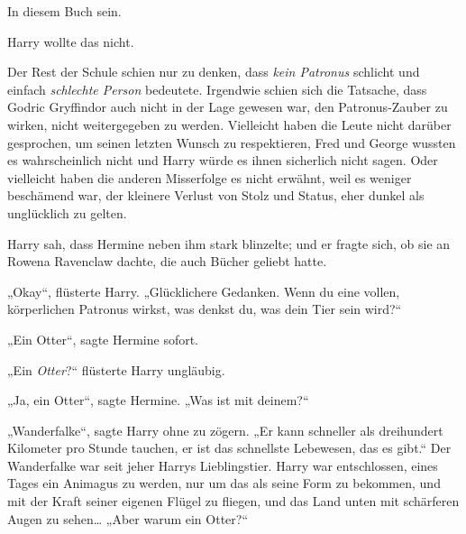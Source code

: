 In diesem Buch sein.

Harry wollte das nicht.

Der Rest der Schule schien nur zu denken, dass \emph{kein Patronus} schlicht und einfach \emph{schlechte Person} bedeutete. Irgendwie schien sich die Tatsache, dass Godric Gryffindor auch nicht in der Lage gewesen war, den Patronus-Zauber zu wirken, nicht weitergegeben zu werden. Vielleicht haben die Leute nicht darüber gesprochen, um seinen letzten Wunsch zu respektieren, Fred und George wussten es wahrscheinlich nicht und Harry würde es ihnen sicherlich nicht sagen. Oder vielleicht haben die anderen Misserfolge es nicht erwähnt, weil es weniger beschämend war, der kleinere Verlust von Stolz und Status, eher dunkel als unglücklich zu gelten.

Harry sah, dass Hermine neben ihm stark blinzelte; und er fragte sich, ob sie an Rowena Ravenclaw dachte, die auch Bücher geliebt hatte.

„Okay“, flüsterte Harry. „Glücklichere Gedanken. Wenn du eine vollen, körperlichen Patronus wirkst, was denkst du, was dein Tier sein wird?“

„Ein Otter“, sagte Hermine sofort.

„Ein \emph{Otter}?“ flüsterte Harry ungläubig.

„Ja, ein Otter“, sagte Hermine. „Was ist mit deinem?“

„Wanderfalke“, sagte Harry ohne zu zögern. „Er kann schneller als dreihundert Kilometer pro Stunde tauchen, er ist das schnellste Lebewesen, das es gibt.“ Der Wanderfalke war seit jeher Harrys Lieblingstier. Harry war entschlossen, eines Tages ein Animagus zu werden, nur um das als seine Form zu bekommen, und mit der Kraft seiner eigenen Flügel zu fliegen, und das Land unten mit schärferen Augen zu sehen… „Aber warum ein Otter?“

